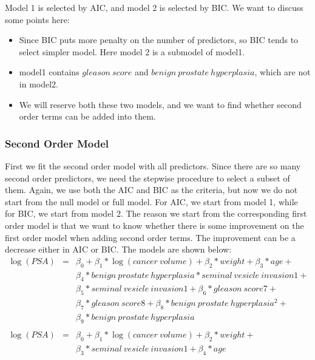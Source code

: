 \documentclass[12pt, letterpaper]{article}
\begin{document}
      Model 1 is selected by AIC, and model 2 is selected by BIC. We want to discuss some points here:

      \begin{itemize}

        \item Since BIC puts more penalty on the number of predictors, so BIC tends to select simpler model. Here model 2 is a submodel of model1.
        \item model1 contains $gleason~score$ and $benign~prostate~hyperplasia$, which are not in model2.
        \item We will reserve both these two models, and we want to find whether second order terms can be added into them.

      \end{itemize}

    \subsubsection{Second Order Model}

      First we fit the second order model with all predictors. Since there are so many second order predictors, we need the stepwise procedure to select a subset of them. Again, we use both the AIC and BIC as the criteria, but now we do not start from the null model or full model. For AIC, we start from model 1, while for BIC, we start from model 2. The reason we start from the corresponding first order model is that we want to know whether there is some improvement on the first order model when adding second order terms. The improvement can be a decrease either in AIC or BIC. The models are shown below:
      \begin{eqnarray}
        \log(PSA) &=& \beta_0 + \beta_1 * \log(cancer~volume) + \beta_2 * weight + \beta_3 * age + \nonumber\\
                   && \beta_4 * benign~prostate~hyperplasia * seminal~vesicle~invasion1 + \nonumber\\
                   && \beta_5 * seminal~vesicle~invasion1 + \beta_6 * gleason~score7 + \nonumber\\
                   && \beta_7 * gleason~score8 + \beta_8 * benign~prostate~hyperplasia^2 + \nonumber\\
                   && \beta_9 * benign~prostate~hyperplasia\\
                   &&\nonumber\\
        \log(PSA) &=& \beta_0 + \beta_1 * \log(cancer~volume) + \beta_2 * weight + \nonumber\\
                   && \beta_3 * seminal~vesicle~invasion1 + \beta_4 * age
      \end{eqnarray}
\end{document}
